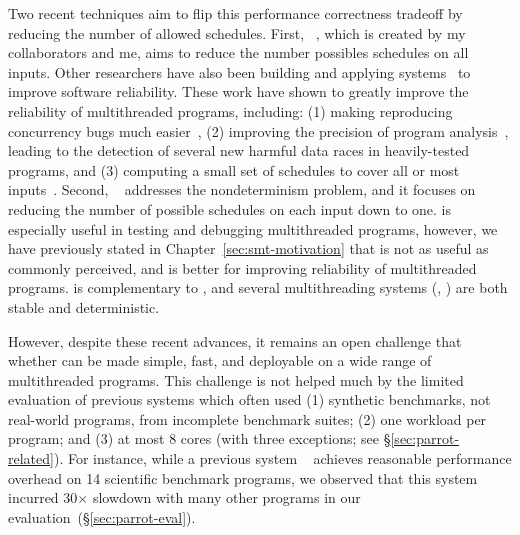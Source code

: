 Two recent techniques aim to flip this performance \vs correctness tradeoff
by reducing the number of allowed schedules. First, 
\smt~\cite{determinator:osdi10, cui:tern:osdi10, dthreads:sosp11, 
peregrine:sosp11}, which is created by my collaborators and me, aims to reduce 
the number possibles schedules on all inputs. Other researchers have also been 
building and applying \smt
systems~\cite{determinator:osdi10, dthreads:sosp11, bergan:oopsla13} to improve
software reliability. These work have shown to greatly improve the
reliability of multithreaded programs, including: (1) making reproducing
concurrency bugs much easier~\cite{cui:tern:osdi10, peregrine:sosp11}, (2)
improving the precision of program analysis~\cite{peregrine:sosp11, wu:pldi12},
leading to the detection of several new harmful data races in heavily-tested 
programs, and (3) computing a small set of schedules to cover all or most 
inputs~\cite{bergan:oopsla13}. Second, 
\dmt~\cite{dmp:asplos09,kendo:asplos09,coredet:asplos10,
dos:osdi10,grace:oopsla09} addresses the nondeterminism problem, and it focuses
on reducing the number of possible schedules on each input down to one. \dmt is
especially useful in testing and debugging multithreaded programs, however, we
have previously stated in Chapter~\ref{sec:smt-motivation} that \dmt is not as
useful as commonly perceived, and \smt is better for improving reliability of
multithreaded programs. \smt is complementary to \dmt, and several 
multithreading systems (\eg, \cite{determinator:osdi10, dthreads:sosp11, 
cui:tern:osdi10, peregrine:sosp11}) are both stable and deterministic.

However, despite these recent advances, it remains an
open challenge that whether \smt can be made simple, fast, and 
deployable on a wide range of multithreaded programs.  
This challenge is not helped much by the limited
evaluation of previous systems which often used (1) synthetic benchmarks, not
real-world programs, from incomplete benchmark suites; (2) one workload
per program; and (3) at most 8 cores (with three exceptions; see
\S\ref{sec:parrot-related}). For instance, while a previous
system \dthreads~\cite{dthreads:sosp11} achieves reasonable performance 
overhead on 14 scientific benchmark programs, we observed that
this system incurred 30$\times$ slowdown with many other programs in our
evaluation~(\S\ref{sec:parrot-eval}).

